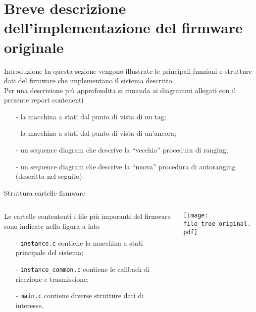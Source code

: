 \section{Breve descrizione dell'implementazione del firmware originale}

\begin{frame}{Introduzione}
  In questa sezione vengono illustrate le principali funzioni e strutture dati
  del firmware che implementano il sistema descritto.\\
  Per una descrizione più approfondita si rimanda ai diagrammi allegati con il presente
  report contenenti
  \begin{itemize}
  \item[-] la macchina a stati dal punto di vista di un tag;
  \item[-] la macchina a stati dal punto di vista di un'ancora;
  \item[-] un sequence diagram che descrive la ``vecchia'' procedura di ranging;
  \item[-] un sequence diagram che descrive la ``nuova'' procedura di autoranging
    (descritta nel seguito).
  \end{itemize}
\end{frame}

\begin{frame}{Struttura cartelle firmware}
  \begin{columns}
    \begin{column}{0.6\textwidth}
      Le cartelle contententi i file più imporanti del firmware sono indicate nella figura a lato\\
      \begin{itemize}
      \item[-] \lstinline!instance.c! contiene la macchina a stati principale del sistema;
      \item[-] \lstinline!instance_common.c! contiene le \alert{callback} di ricezione e trasmissione;
      \item[-] \lstinline!main.c! contiene diverse strutture dati di interesse.
      \end{itemize}
    \end{column}
    \begin{column}{0.3\textwidth}
      \centering
      \texttt{[image: file\_tree\_original.pdf]}
    \end{column}
  \end{columns}
\end{frame}

